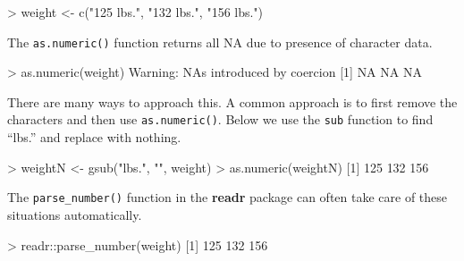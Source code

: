 \documentclass[
]{book}
\newenvironment{Shaded}{\begin{snugshade}}{\end{snugshade}}
\newcommand{\ConstantTok}[1]{\textcolor[rgb]{0.00,0.00,0.00}{#1}}
\newcommand{\DecValTok}[1]{\textcolor[rgb]{0.00,0.00,0.81}{#1}}
\newcommand{\FunctionTok}[1]{\textcolor[rgb]{0.00,0.00,0.00}{#1}}
\newcommand{\NormalTok}[1]{#1}
\newcommand{\OtherTok}[1]{\textcolor[rgb]{0.56,0.35,0.01}{#1}}
\newcommand{\SpecialCharTok}[1]{\textcolor[rgb]{0.00,0.00,0.00}{#1}}
\newcommand{\StringTok}[1]{\textcolor[rgb]{0.31,0.60,0.02}{#1}}
\begin{document}
\begin{Shaded}
\begin{Highlighting}[]
\SpecialCharTok{\textgreater{}}\NormalTok{ weight }\OtherTok{\textless{}{-}} \FunctionTok{c}\NormalTok{(}\StringTok{"125 lbs."}\NormalTok{, }\StringTok{"132 lbs."}\NormalTok{, }\StringTok{"156 lbs."}\NormalTok{)}
\end{Highlighting}
\end{Shaded}

The \texttt{as.numeric()} function returns all NA due to presence of character data.

\begin{Shaded}
\begin{Highlighting}[]
\SpecialCharTok{\textgreater{}} \FunctionTok{as.numeric}\NormalTok{(weight)}
\NormalTok{Warning}\SpecialCharTok{:}\NormalTok{ NAs introduced by coercion}
\NormalTok{[}\DecValTok{1}\NormalTok{] }\ConstantTok{NA} \ConstantTok{NA} \ConstantTok{NA}
\end{Highlighting}
\end{Shaded}

There are many ways to approach this. A common approach is to first remove the characters and then use \texttt{as.numeric()}. Below we use the \texttt{sub} function to find ``lbs.'' and replace with nothing.

\begin{Shaded}
\begin{Highlighting}[]
\SpecialCharTok{\textgreater{}}\NormalTok{ weightN }\OtherTok{\textless{}{-}} \FunctionTok{gsub}\NormalTok{(}\StringTok{"lbs."}\NormalTok{, }\StringTok{""}\NormalTok{, weight)}
\SpecialCharTok{\textgreater{}} \FunctionTok{as.numeric}\NormalTok{(weightN)}
\NormalTok{[}\DecValTok{1}\NormalTok{] }\DecValTok{125} \DecValTok{132} \DecValTok{156}
\end{Highlighting}
\end{Shaded}

The \texttt{parse\_number()} function in the \textbf{readr} package can often take care of these situations automatically.

\begin{Shaded}
\begin{Highlighting}[]
\SpecialCharTok{\textgreater{}}\NormalTok{ readr}\SpecialCharTok{::}\FunctionTok{parse\_number}\NormalTok{(weight)}
\NormalTok{[}\DecValTok{1}\NormalTok{] }\DecValTok{125} \DecValTok{132} \DecValTok{156}
\end{Highlighting}
\end{Shaded}
\end{document}
